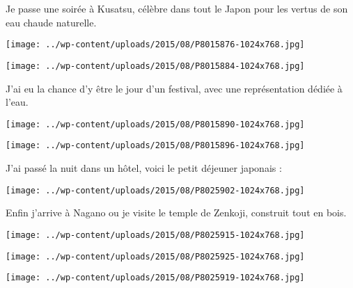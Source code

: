 \pagebreak
 Je passe une soirée à Kusatsu, célèbre dans tout le Japon pour les vertus de son eau chaude naturelle. 
\begin{center} \texttt{[image: ../wp-content/uploads/2015/08/P8015876-1024x768.jpg]} \end{center}
\begin{center} \texttt{[image: ../wp-content/uploads/2015/08/P8015884-1024x768.jpg]} \end{center}

\pagebreak
 J'ai eu la chance d'y être le jour d'un festival, avec une représentation dédiée à l'eau.  
\begin{center} \texttt{[image: ../wp-content/uploads/2015/08/P8015890-1024x768.jpg]} \end{center}
\begin{center} \texttt{[image: ../wp-content/uploads/2015/08/P8015896-1024x768.jpg]} \end{center}

\pagebreak
 J'ai passé la nuit dans un hôtel, voici le petit déjeuner japonais : 
\begin{center} \texttt{[image: ../wp-content/uploads/2015/08/P8025902-1024x768.jpg]} \end{center}

 Enfin j'arrive à Nagano ou je visite le temple de Zenkoji, construit tout en bois. 
\begin{center} \texttt{[image: ../wp-content/uploads/2015/08/P8025915-1024x768.jpg]} \end{center}
\begin{center} \texttt{[image: ../wp-content/uploads/2015/08/P8025925-1024x768.jpg]} \end{center}
\begin{center} \texttt{[image: ../wp-content/uploads/2015/08/P8025919-1024x768.jpg]} \end{center}